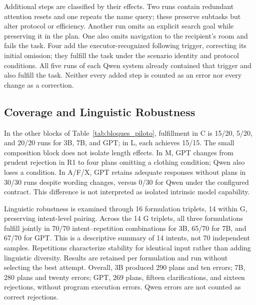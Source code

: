 \documentclass[a4paper,twoside]{article}
\begin{document}
Additional steps are classified by their effects. Two runs contain redundant attention resets and one repeats the name query; these preserve subtasks but alter protocol or efficiency. Another run omits an explicit search goal while preserving it in the plan. One also omits navigation to the recipient's room and fails the task. Four add the executor-recognized following trigger, correcting its initial omission; they fulfill the task under the scenario identity and protocol conditions. All five runs of each Qwen system already contained that trigger and also fulfill the task. Neither every added step is counted as an error nor every change as a correction.

\subsection{Coverage and Linguistic Robustness}
In the other blocks of Table~\ref{tab:bloques_piloto}, fulfillment in C is 15/20, 5/20, and 20/20 runs for 3B, 7B, and GPT; in L, each achieves 15/15. The small composition block does not isolate length effects. In M, GPT changes from prudent rejection in R1 to four plans omitting a clothing condition; Qwen also loses a condition. In A/F/X, GPT retains adequate responses without plans in 30/30 runs despite wording changes, versus 0/30 for Qwen under the configured contract. This difference is not interpreted as isolated intrinsic model capability.

Linguistic robustness is examined through 16 formulation triplets, 14 within G, preserving intent-level pairing. Across the 14 G triplets, all three formulations fulfill jointly in 70/70 intent--repetition combinations for 3B, 65/70 for 7B, and 67/70 for GPT. This is a descriptive summary of 14 intents, not 70 independent samples. Repetitions characterize stability for identical input rather than adding linguistic diversity. Results are retained per formulation and run without selecting the best attempt. Overall, 3B produced 290 plans and ten errors; 7B, 280 plans and twenty errors; GPT, 269 plans, fifteen clarifications, and sixteen rejections, without program execution errors. Qwen errors are not counted as correct rejections.
\end{document}
